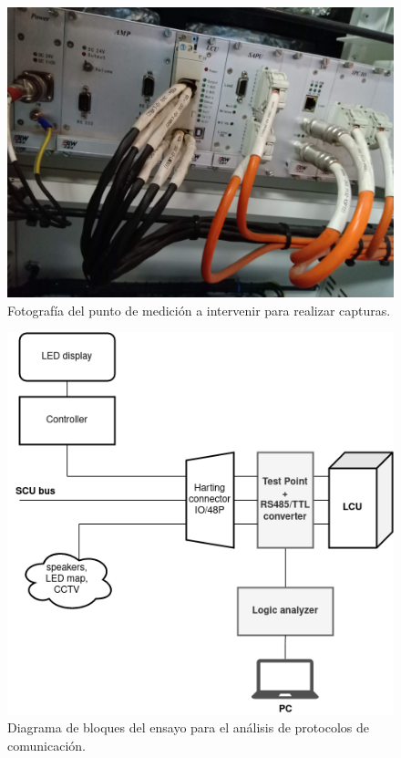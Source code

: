 \documentclass[
11pt, %
]{charter}
\begin{document}
\begin{figure}[htpb]
\centering 
\includegraphics[width=1\textwidth]{./Pics/IMG_20210322_122403.jpg}
\caption{Fotografía del punto de medición a intervenir para realizar capturas.}
\label{fig:NOsniffingPhoto}
\end{figure}



\begin{figure}[htpb]
\centering 
\includegraphics[width=1\textwidth]{./Pics/sniffingDiagram.drawio.png}
\caption{Diagrama de bloques del ensayo para el análisis de protocolos de comunicación.}
\label{fig:sniffingDiagram}
\end{figure}
\end{document}
